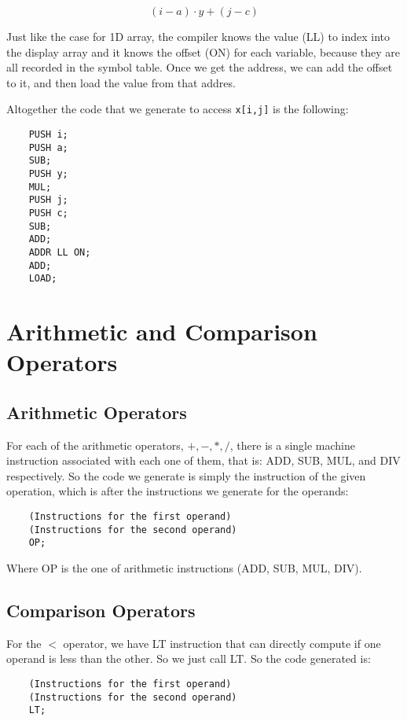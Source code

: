 \documentclass{article}
\begin{document}
$$(i - a) \cdot y + (j - c)$$

Just like the case for 1D array, the compiler knows the value (LL) to index into the display array and it knows the offset (ON) for each variable, because they are all recorded in the symbol table. Once we get the address, we can add the offset to it, and then load the value from that addres.

Altogether the code that we generate to access \texttt{x[i,j]} is the following:

\begin{lstlisting}
    PUSH i;
    PUSH a;
    SUB;
    PUSH y;
    MUL;
    PUSH j;
    PUSH c;
    SUB;
    ADD;
    ADDR LL ON;
    ADD;
    LOAD;
\end{lstlisting}


\section{Arithmetic and Comparison Operators}

\subsection{Arithmetic Operators}

For each of the arithmetic operators, $+,-,*,/$, there is a single machine instruction associated with each one of them, that is: ADD, SUB, MUL, and DIV respectively. So the code we generate is simply the instruction of the given operation, which is after the instructions we generate for the operands:

\begin{lstlisting}
    (Instructions for the first operand)
    (Instructions for the second operand)
    OP;
\end{lstlisting}

Where OP is the one of arithmetic instructions (ADD, SUB, MUL, DIV).

\subsection{Comparison Operators}

For the $<$ operator, we have LT instruction that can directly compute if one operand is less than the other. So we just call LT. So the code generated is:

\begin{lstlisting}
    (Instructions for the first operand)
    (Instructions for the second operand)
    LT;
\end{lstlisting}
\end{document}
